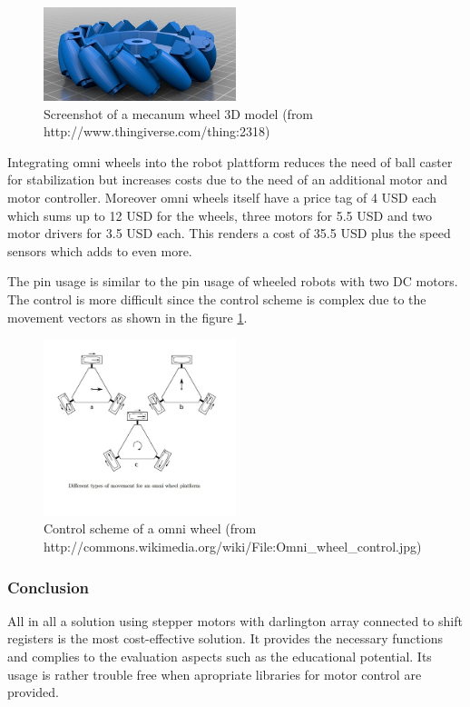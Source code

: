 \documentclass[11pt,a4paper]{article}
\begin{document}
\begin{figure}[H]
  \centering
  \includegraphics[width=0.5\textwidth]{images/mecanum.png}
  \caption{Screenshot of a mecanum wheel 3D model (from http://www.thingiverse.com/thing:2318)}
\end{figure}

Integrating omni wheels into the robot plattform reduces the need of ball caster for stabilization but increases costs due to the need of an additional motor and motor controller. Moreover omni wheels itself have a price tag of 4 USD each which sums up to 12 USD for the wheels, three motors for 5.5 USD and two motor drivers for 3.5 USD each. This renders a cost of 35.5 USD plus the speed sensors which adds to even more. 

The pin usage is similar to the pin usage of wheeled robots with two DC motors. The control is more difficult since the control scheme is complex due to the movement vectors as shown in the figure \ref{fig:omnicontrol}.

\begin{figure}[H]
  \centering
  \includegraphics[width=0.5\textwidth]{images/omniwheel.jpg}
  \caption{Control scheme of a omni wheel (from http://commons.wikimedia.org/wiki/File:Omni\_wheel\_control.jpg)}
  \label{fig:omnicontrol}
\end{figure}


\subsubsection{Conclusion}
All in all a solution using stepper motors with darlington array connected to shift registers is the most cost-effective solution. It provides the necessary functions and complies to the evaluation aspects such as the educational potential. Its usage is rather trouble free when apropriate libraries for motor control are provided.
\end{document}
